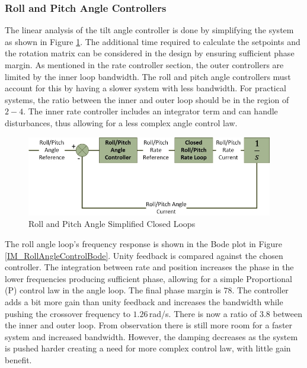 		\subsubsection{Roll and Pitch Angle Controllers}
		The linear analysis of the tilt angle controller is done by simplifying the system as shown in Figure \ref{IM_RollAngleLoop}. The additional time required to calculate the setpoints and the rotation matrix can be considered in the design by ensuring sufficient phase margin. As mentioned in the rate controller section, the outer controllers are limited by the inner loop bandwidth. The roll and pitch angle controllers must account for this by having a slower system with less bandwidth. For practical systems, the ratio between the inner and outer loop should be in the region of $2 - 4$. The inner rate controller includes an integrator term and can handle disturbances, thus allowing for a less complex angle control law. 
		
		\begin{figure}[H]
			\centering
			\includegraphics[height = 3.5cm]{../References/Diagrams/RollPitchAngleLoop.jpg}
			\caption{Roll and Pitch Angle Simplified Closed Loops}
			\label{IM_RollAngleLoop}
		\end{figure}
		
		The roll angle loop's frequency response is shown in the Bode plot in Figure \ref{IM_RollAngleControlBode}. Unity feedback is compared against the chosen controller. The integration between rate and position increases the phase in the lower frequencies producing sufficient phase, allowing for a simple Proportional (P) control law in the angle loop. The final phase margin is $78$\textdegree. The controller adds a bit more gain than unity feedback and increases the bandwidth while pushing the crossover frequency to $1.26$\,rad/s. There is now a ratio of $3.8$ between the inner and outer loop. From observation there is still more room for a faster system and increased bandwidth. However, the damping decreases as the system is pushed harder creating a need for more complex control law, with little gain benefit.
		
